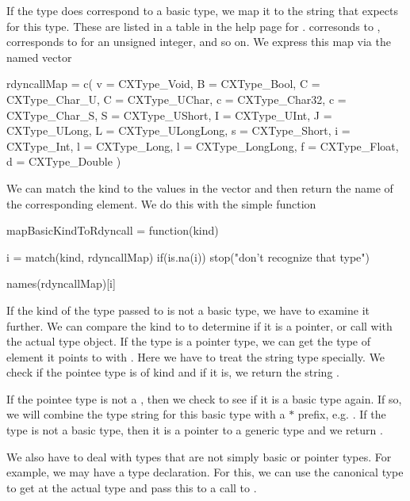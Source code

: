 If the type does correspond to a basic type, we map it to 
the string that  expects for this type.
These are listed in a table in the help page for .
 corresonds to ,  corresponds
to  for an unsigned integer, and so on.
We express this map via the named \R{} vector
\begin{RCode}
rdyncallMap = c(
  v = CXType_Void,
  B = CXType_Bool,
  C = CXType_Char_U,
  C = CXType_UChar,
  c = CXType_Char32,
  c = CXType_Char_S,
  S = CXType_UShort,
  I = CXType_UInt,
  J = CXType_ULong,
  L = CXType_ULongLong,
  s = CXType_Short,
  i = CXType_Int,
  l = CXType_Long,
  l = CXType_LongLong,
  f = CXType_Float,
  d = CXType_Double
)
\end{RCode}
We can match the \libclang{} kind to the values in the vector and then
return the name of the corresponding element.
We do this with the simple function
\begin{RCode}
mapBasicKindToRdyncall =
function(kind)
{
  i = match(kind, rdyncallMap)
  if(is.na(i))
    stop("don't recognize that type")

  names(rdyncallMap)[i]
}
\end{RCode}
  
If the kind of the type passed to  is not a basic
type, we have to examine it further.  We can compare the kind to
 to determine if it is a pointer, or call
 with the actual type object.  If the type is a
pointer type, we can get the type of element it points to with
.  Here we have to treat the \C{} string type
   specially.  We check if the pointee type is of kind
   and if it is, we return the
   string .

If the pointee type is not a , then we check to
see if it is a basic type again. If so, we will combine the type
string for this basic type with a $\ast$ prefix, e.g. .  If
the type is not a basic type, then it is a pointer to a generic \C{}
type and we return .

We also have to deal with types that are not simply basic or pointer
types. For example, we may have a type declaration.  For this, we can
use the canonical type to get at the actual type and pass this to a
call to .


